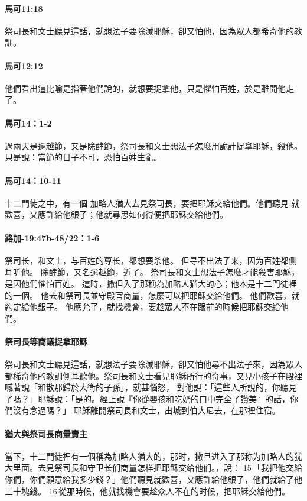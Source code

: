 \paragraph{馬可11:18}
祭司長和文士聽見這話，就想法子要除滅耶穌，卻又怕他，因為眾人都希奇他的教訓。
\paragraph{馬可12:12}
他們看出這比喻是指著他們說的，就想要捉拿他，只是懼怕百姓，於是離開他走了。
\paragraph{馬可14：1-2}
過兩天是逾越節，又是除酵節，祭司長和文士想法子怎麼用詭計捉拿耶穌，殺他。只是說：當節的日子不可，恐怕百姓生亂。
\paragraph{馬可14：10-11}
十二門徒之中，有一個 加略人猶大去見祭司長，要把耶穌交給他們。他們聽見 就歡喜，又應許給他銀子；他就尋思如何得便把耶穌交給他們。

\paragraph{路加-19:47b-48/22：1-6}
祭司长，和文士，与百姓的尊长，都想要杀他。 但寻不出法子来，因为百姓都侧耳听他。
除酵節，又名逾越節，近了。
祭司長和文士想法子怎麼才能殺害耶穌，是因他們懼怕百姓。
這時，撒但入了那稱為加略人猶大的心；他本是十二門徒裡的一個。
他去和祭司長並守殿官商量，怎麼可以把耶穌交給他們。
他們歡喜，就約定給他銀子。
他應允了，就找機會，要趁眾人不在跟前的時候把耶穌交給他們。

\paragraph{祭司長等商議捉拿耶穌}
祭司長和文士聽見這話，就想法子要除滅耶穌，卻又怕他尋不出法子來，因為眾人都稀奇他的教訓側耳聽他。祭司長和文士看見耶穌所行的奇事，又見小孩子在殿裡喊著說「和散那歸於大衛的子孫」，就甚惱怒， 對他說：「這些人所說的，你聽見了嗎？」耶穌說：「是的。經上說『你從嬰孩和吃奶的口中完全了讚美』的話，你們沒有念過嗎？」
耶穌離開祭司長和文士，出城到伯大尼去，在那裡住宿。
\paragraph{猶大與祭司長商量賣主}
當下，十二門徒裡有一個稱為加略人猶大的，那时，撒旦进入了那称为加略人的犹大里面。去見祭司長和守卫长们商量怎样把耶稣交给他们。，說： 15 「我把他交給你們，你們願意給我多少錢？」他們聽見就歡喜，又應許給他銀子，他們就給了他三十塊錢。 16 從那時候，他就找機會要趁众人不在的时候，把耶穌交給他們。

